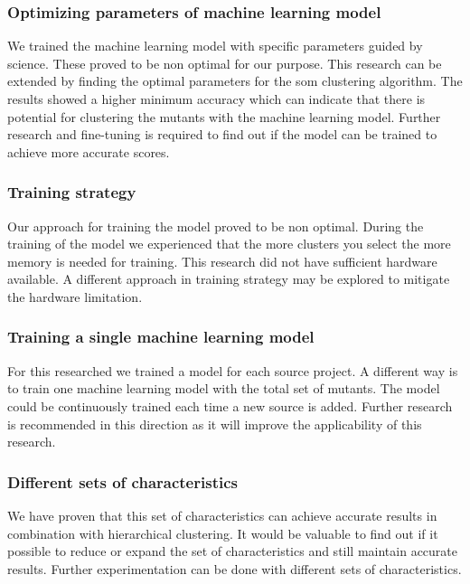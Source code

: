 \documentclass[../main]{subfiles}
\begin{document}
\subsubsection{Optimizing parameters of machine learning model}
We trained the machine learning model with specific parameters guided by science. 
These proved to be non optimal for our purpose.
This research can be extended by finding the optimal parameters for the \acrshort{som} clustering algorithm.
The results showed a higher minimum accuracy which can indicate that there is potential for clustering the mutants with the machine learning model.
Further research and fine-tuning is required to find out if the model can be trained to achieve more accurate scores.

\subsubsection{Training strategy}
Our approach for training the model proved to be non optimal.
During the training of the model we experienced that the more clusters you select the more memory is needed for training.
This research did not have sufficient hardware available.
A different approach in training strategy may be explored to mitigate the hardware limitation.

\subsubsection{Training a single machine learning model}
For this researched we trained a model for each source project. 
A different way is to train one machine learning model with the total set of mutants.
The model could be continuously trained each time a new source is added.
Further research is recommended in this direction as it will improve the applicability of this research.

\subsubsection{Different sets of characteristics}
We have proven that this set of characteristics can achieve accurate results in combination with hierarchical clustering.
It would be valuable to find out if it possible to reduce or expand the set of characteristics and still maintain accurate results.
Further experimentation can be done with different sets of characteristics.
\end{document}
